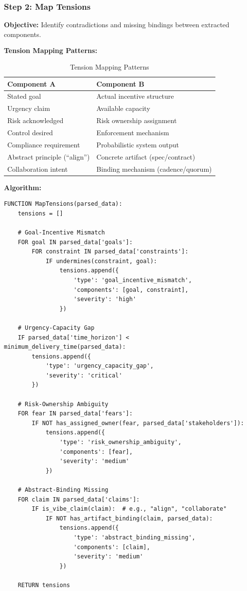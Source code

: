 \documentclass[11pt,a4paper]{article}
\begin{document}
\subsubsection{Step 2: Map Tensions}

\textbf{Objective:} Identify contradictions and missing bindings between extracted components.

\textbf{Tension Mapping Patterns:}

\begin{table}[h]
\centering
\begin{tabular}{|l|l|}
\hline
\textbf{Component A} & \textbf{Component B} \\ \hline
Stated goal & Actual incentive structure \\ \hline
Urgency claim & Available capacity \\ \hline
Risk acknowledged & Risk ownership assignment \\ \hline
Control desired & Enforcement mechanism \\ \hline
Compliance requirement & Probabilistic system output \\ \hline
Abstract principle (``align'') & Concrete artifact (spec/contract) \\ \hline
Collaboration intent & Binding mechanism (cadence/quorum) \\ \hline
\end{tabular}
\caption{Tension Mapping Patterns}
\label{tab:tension_patterns}
\end{table}

\textbf{Algorithm:}
\begin{verbatim}
FUNCTION MapTensions(parsed_data):
    tensions = []
    
    # Goal-Incentive Mismatch
    FOR goal IN parsed_data['goals']:
        FOR constraint IN parsed_data['constraints']:
            IF undermines(constraint, goal):
                tensions.append({
                    'type': 'goal_incentive_mismatch',
                    'components': [goal, constraint],
                    'severity': 'high'
                })
    
    # Urgency-Capacity Gap
    IF parsed_data['time_horizon'] < minimum_delivery_time(parsed_data):
        tensions.append({
            'type': 'urgency_capacity_gap',
            'severity': 'critical'
        })
    
    # Risk-Ownership Ambiguity
    FOR fear IN parsed_data['fears']:
        IF NOT has_assigned_owner(fear, parsed_data['stakeholders']):
            tensions.append({
                'type': 'risk_ownership_ambiguity',
                'components': [fear],
                'severity': 'medium'
            })
    
    # Abstract-Binding Missing
    FOR claim IN parsed_data['claims']:
        IF is_vibe_claim(claim):  # e.g., "align", "collaborate"
            IF NOT has_artifact_binding(claim, parsed_data):
                tensions.append({
                    'type': 'abstract_binding_missing',
                    'components': [claim],
                    'severity': 'medium'
                })
    
    RETURN tensions
\end{verbatim}
\end{document}
